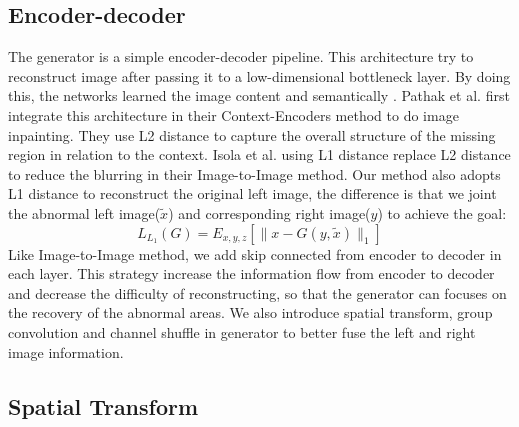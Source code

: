 \documentclass{IEEE_lsens}
\begin{document}
\subsection{Encoder-decoder}

The generator is a simple encoder-decoder pipeline. This architecture try to reconstruct image after passing it to a low-dimensional bottleneck layer. By doing this, the networks learned the image content and semantically \cite{Hinton2006:s:Reducing,Bengio:Co:Learning,Vincent2008::Extracting}. Pathak et al. \cite{Pathak2016::Context} first integrate this architecture in their Context-Encoders method to do image inpainting. They use L2 distance to capture the overall structure of the missing region in relation to the context. Isola et al. \cite{Isola2017::Image} using L1 distance replace L2 distance to reduce the blurring in their Image-to-Image method. Our method also adopts L1 distance to reconstruct the original left image, the difference is that we joint the abnormal left image($\tilde{x}$) and corresponding right image($y$) to achieve the goal:
\begin{equation}
    L_{L_1}(G) = E_{x,y,z} [\|x-G(y,\tilde{x})\|_1]
\end{equation}
Like Image-to-Image method, we add skip connected from encoder to decoder in each layer. This strategy increase the information flow from encoder to decoder and decrease the difficulty of reconstructing, so that the generator can focuses on the recovery of the abnormal areas.
We also introduce spatial transform, group convolution and channel shuffle in generator to better fuse the left and right image information.

\subsection{Spatial Transform}
\end{document}
